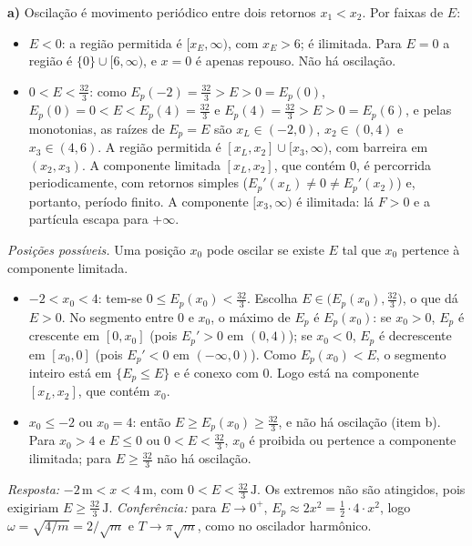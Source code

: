 \documentclass{article}%
\begin{document}
\textbf{a)} Oscilação é movimento periódico entre dois retornos $x_1<x_2$. Por faixas de $E$:
\begin{itemize}
\item $E<0$: a região permitida é $[x_E,\infty)$, com $x_E>6$; é ilimitada. Para $E=0$ a região é $\{0\}\cup[6,\infty)$, e $x=0$ é apenas repouso. Não há oscilação.
\item $0<E<\tfrac{32}{3}$: como $E_p(-2)=\tfrac{32}{3}>E>0=E_p(0)$, $E_p(0)=0<E<E_p(4)=\tfrac{32}{3}$ e $E_p(4)=\tfrac{32}{3}>E>0=E_p(6)$, e pelas monotonias, as raízes de $E_p=E$ são $x_L\in(-2,0)$, $x_2\in(0,4)$ e $x_3\in(4,6)$. A região permitida é $[x_L,x_2]\cup[x_3,\infty)$, com barreira em $(x_2,x_3)$. A componente limitada $[x_L,x_2]$, que contém $0$, é percorrida periodicamente, com retornos simples ($E_p'(x_L)\neq 0\neq E_p'(x_2)$) e, portanto, período finito. A componente $[x_3,\infty)$ é ilimitada: lá $F>0$ e a partícula escapa para $+\infty$.
\end{itemize}
\textit{Posições possíveis.} Uma posição $x_0$ pode oscilar se existe $E$ tal que $x_0$ pertence à componente limitada.
\begin{itemize}
\item $-2<x_0<4$: tem-se $0\le E_p(x_0)<\tfrac{32}{3}$. Escolha $E\in\bigl(E_p(x_0),\tfrac{32}{3}\bigr)$, o que dá $E>0$. No segmento entre $0$ e $x_0$, o máximo de $E_p$ é $E_p(x_0)$: se $x_0>0$, $E_p$ é crescente em $[0,x_0]$ (pois $E_p'>0$ em $(0,4)$); se $x_0<0$, $E_p$ é decrescente em $[x_0,0]$ (pois $E_p'<0$ em $(-\infty,0)$). Como $E_p(x_0)<E$, o segmento inteiro está em $\{E_p\le E\}$ e é conexo com $0$. Logo está na componente $[x_L,x_2]$, que contém $x_0$.
\item $x_0\le -2$ ou $x_0=4$: então $E\ge E_p(x_0)\ge\tfrac{32}{3}$, e não há oscilação (item b). Para $x_0>4$ e $E\le 0$ ou $0<E<\tfrac{32}{3}$, $x_0$ é proibida ou pertence a componente ilimitada; para $E\ge\tfrac{32}{3}$ não há oscilação.
\end{itemize}
\textit{Resposta:} $-2\,\mathrm{m}<x<4\,\mathrm{m}$, com $0<E<\tfrac{32}{3}\,\mathrm{J}$. Os extremos não são atingidos, pois exigiriam $E\ge\tfrac{32}{3}\,\mathrm{J}$. \textit{Conferência:} para $E\to 0^{+}$, $E_p\approx 2x^{2}=\tfrac12\cdot 4\cdot x^{2}$, logo $\omega=\sqrt{4/m}=2/\sqrt{m}$ e $T\to\pi\sqrt{m}$, como no oscilador harmônico.
\end{document}
